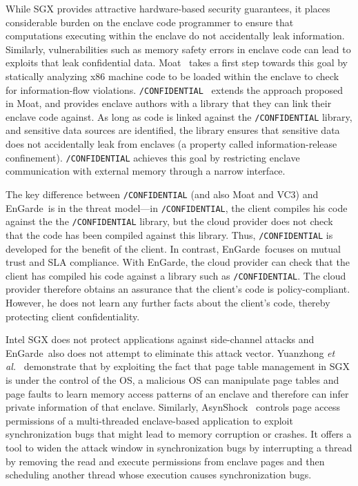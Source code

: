 \documentclass[conference,compsoc]{IEEEtran}
\newcommand{\code}[1]{{\tt \footnotesize #1}}
\newcommand{\etal}{\textit{et al.}\xspace}
\newcommand{\tool}{EnGarde\xspace} %
\begin{document}
While SGX provides attractive hardware-based security guarantees, it places
considerable burden on the enclave code programmer to ensure that computations
executing within the enclave do not accidentally leak information.  Similarly,
vulnerabilities such as memory safety errors in enclave code can lead to
exploits that leak confidential data.  Moat~\cite{moat:ccs15} takes a first
step towards this goal by statically analyzing x86 machine code to be loaded
within the enclave to check for information-flow violations.
\code{/CONFIDENTIAL}~\cite{moatplus:pldi16} extends the approach proposed in
Moat, and provides enclave authors with a library that they can link their
enclave code against. As long as code is linked against the
\code{/CONFIDENTIAL} library, and sensitive data sources are identified, the
library ensures that sensitive data does not accidentally leak from enclaves
(a property called information-release confinement).
\code{/CONFIDENTIAL} achieves this goal by restricting enclave communication
with external memory through a narrow interface. 

The key difference between \code{/CONFIDENTIAL} (and also Moat and VC3) and
\tool\ is in the threat model---in \code{/CONFIDENTIAL}, the client compiles
his code against the the \code{/CONFIDENTIAL} library, but the cloud provider
does not check that the code has been compiled against this library. Thus,
\code{/CONFIDENTIAL} is developed for the benefit of the client.  In contrast,
\tool\ focuses on mutual trust and SLA compliance. With \tool, the cloud
provider can check that the client has compiled his code against a library such
as \code{/CONFIDENTIAL}. The cloud provider therefore obtains an assurance that
the client's code is policy-compliant. However, he does not learn any further
facts about the client's code, thereby protecting client confidentiality.

Intel SGX does not protect applications against side-channel attacks and \tool\
also does not attempt to eliminate this attack vector. Yuanzhong
\etal~\cite{controlledchannel:oak15} demonstrate that by exploiting the fact
that page table management in SGX is under the control of the OS, a malicious
OS can manipulate page tables and page faults to learn memory access patterns
of an enclave and therefore can infer private information of that enclave.
Similarly, AsynShock~\cite{asyncshock:esorics16} controls page access
permissions of a multi-threaded enclave-based application to exploit
synchronization bugs that might lead to memory corruption or crashes. It offers
a tool to widen the attack window in synchronization bugs by interrupting a
thread by removing the read and execute permissions from enclave pages and then
scheduling another thread whose execution causes synchronization bugs.
\end{document}
